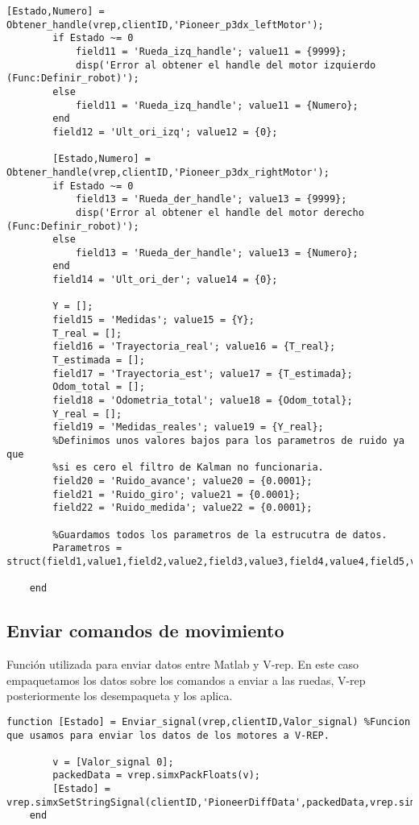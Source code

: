 \begin{lstlisting}[frame=single]
        [Estado,Numero] = Obtener_handle(vrep,clientID,'Pioneer_p3dx_leftMotor');
        if Estado ~= 0 
            field11 = 'Rueda_izq_handle'; value11 = {9999};
            disp('Error al obtener el handle del motor izquierdo (Func:Definir_robot)');    
        else
            field11 = 'Rueda_izq_handle'; value11 = {Numero};
        end
        field12 = 'Ult_ori_izq'; value12 = {0};
        
        [Estado,Numero] = Obtener_handle(vrep,clientID,'Pioneer_p3dx_rightMotor');
        if Estado ~= 0 
            field13 = 'Rueda_der_handle'; value13 = {9999};
            disp('Error al obtener el handle del motor derecho (Func:Definir_robot)');   
        else
            field13 = 'Rueda_der_handle'; value13 = {Numero};
        end
        field14 = 'Ult_ori_der'; value14 = {0};
        
        Y = [];
        field15 = 'Medidas'; value15 = {Y};
        T_real = [];
        field16 = 'Trayectoria_real'; value16 = {T_real};
        T_estimada = [];
        field17 = 'Trayectoria_est'; value17 = {T_estimada};
        Odom_total = [];
        field18 = 'Odometria_total'; value18 = {Odom_total};
        Y_real = [];
        field19 = 'Medidas_reales'; value19 = {Y_real};
        %Definimos unos valores bajos para los parametros de ruido ya que
        %si es cero el filtro de Kalman no funcionaria.
        field20 = 'Ruido_avance'; value20 = {0.0001};
        field21 = 'Ruido_giro'; value21 = {0.0001};
        field22 = 'Ruido_medida'; value22 = {0.0001};
        
        %Guardamos todos los parametros de la estrucutra de datos.
        Parametros = struct(field1,value1,field2,value2,field3,value3,field4,value4,field5,value5,field6,value6,field7,value7,field8,value8,field9,value9,field10,value10,field11,value11,field12,value12,field13,value13,field14,value14,field15,value15,field16,value1,field17,value17,field18,value18,field19,value19,field20,value20,field21,value21,field22,value22);
        
    end
\end{lstlisting}
\subsection{Enviar comandos de movimiento}
Función utilizada para enviar datos entre Matlab y V-rep.
En este caso empaquetamos los datos sobre los comandos a enviar a las ruedas, V-rep posteriormente los desempaqueta y los aplica.
\begin{lstlisting}[frame=single]
 function [Estado] = Enviar_signal(vrep,clientID,Valor_signal) %Funcion que usamos para enviar los datos de los motores a V-REP.
        
        v = [Valor_signal 0];
        packedData = vrep.simxPackFloats(v);
        [Estado] = vrep.simxSetStringSignal(clientID,'PioneerDiffData',packedData,vrep.simx_opmode_oneshot);
    end
\end{lstlisting}
